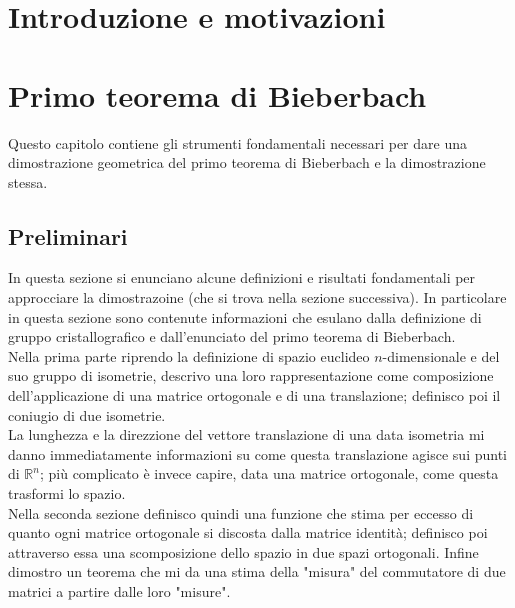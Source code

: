 \documentclass[10pt,a4paper]{book}
\author{Elisa Caruso}
\begin{document}
 

\chapter*{Introduzione e motivazioni}




\chapter{Primo teorema di Bieberbach}
Questo capitolo contiene gli strumenti fondamentali necessari per dare una dimostrazione geometrica del primo teorema di Bieberbach e la dimostrazione stessa. \\


\section{Preliminari}
In questa sezione si enunciano alcune definizioni e risultati fondamentali per approcciare la dimostrazoine (che si trova nella sezione successiva). In particolare in questa sezione sono contenute informazioni che esulano dalla definizione di gruppo cristallografico e dall'enunciato del primo teorema di Bieberbach. \\

Nella prima parte riprendo la definizione di spazio euclideo $n$-dimensionale e del suo gruppo di isometrie, descrivo una loro rappresentazione come composizione dell'applicazione di una matrice ortogonale e di una translazione; definisco poi il coniugio di due isometrie. \\

La lunghezza e la direzzione del vettore translazione di una data isometria mi danno immediatamente informazioni su come questa translazione agisce sui punti di $\mathbb{R}^n$; più complicato è invece capire, data una matrice ortogonale, come questa trasformi lo spazio. \\
Nella seconda sezione definisco quindi una funzione che stima per eccesso di quanto ogni matrice ortogonale si discosta dalla matrice identità; definisco poi attraverso essa una scomposizione dello spazio in due spazi ortogonali. Infine dimostro un teorema che mi da una stima della "misura" del commutatore di due matrici a partire dalle loro "misure".  
\end{document}
